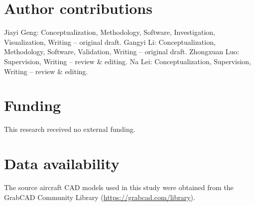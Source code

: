 \documentclass[12pt,a4paper]{article}
\begin{document}
\section*{Author contributions}
Jiayi Geng: Conceptualization, Methodology, Software, Investigation, Visualization, Writing -- original draft. Gangyi Li: Conceptualization, Methodology, Software, Validation, Writing -- original draft. Zhongxuan Luo: Supervision, Writing -- review \& editing. Na Lei: Conceptualization, Supervision, Writing -- review \& editing.

\section*{Funding}
This research received no external funding.

\section*{Data availability}
The source aircraft CAD models used in this study were obtained from the GrabCAD Community Library (\url{https://grabcad.com/library}).

\begingroup
\singlespacing
\renewcommand*{\bibfont}{\small}
\printbibliography
\endgroup
\end{document}
